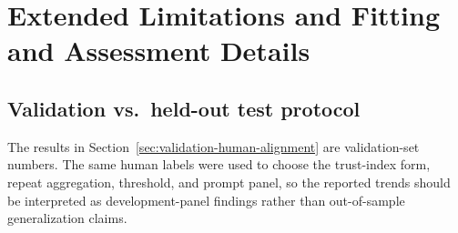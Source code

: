 \documentclass{article}
\begin{document}






\appendix

\section{Extended Limitations and Fitting and Assessment Details}\label{app:limitations-extended}

\subsection{Validation vs.\ held-out test protocol}
The results in Section~\ref{sec:validation-human-alignment} are validation-set numbers. The same human labels were used to choose the trust-index form, repeat aggregation, threshold, and prompt panel, so the reported trends should be interpreted as development-panel findings rather than out-of-sample generalization claims.
\end{document}
